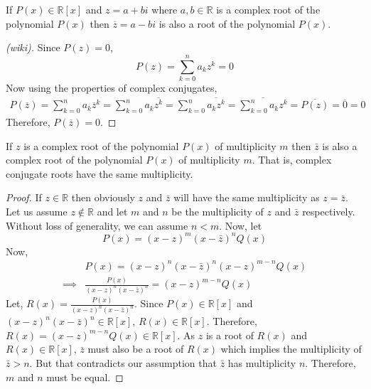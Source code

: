 \begin{theorem}
    If $P(x) \in \mathbb{R}[x]$ and $z=a+bi$ where $a,b \in \mathbb{R}$ is a complex root of the polynomial 
    $P(x)$ then $\overline{z}=a-bi$ is also a root of the polynomial $P(x)$.
\end{theorem}
\begin{proof}[(wiki)]
    Since $P(z)=0$,
    \begin{equation*}
        P(z) = \sum_{k=0}^{n} a_{k} z^{k} = 0
    \end{equation*}
    Now using the properties of complex conjugates,
    \begin{align*}
        P(\overline{z}) = \sum_{k=0}^{n} a_{k} \overline{z}^{k} 
                        = \sum_{k=0}^{n} a_{k} \overline{z^{k}} 
                        = \sum_{k=0}^{n} \overline{a_{k} z^{k}} 
                        = \overline{\sum_{k=0}^{n} a_{k} z^{k}} 
                        = \overline{P(z)} 
                        = \overline{0} 
                        = 0
    \end{align*}
    Therefore, $P(\overline{z})=0$.
\end{proof}
\begin{corollary}
    If $z$ is a complex root of the polynomial $P(x)$ of multiplicity $m$ then $\bar{z}$ is also 
    a complex root of the polynomial $P(x)$ of multiplicity $m$. That is, complex conjugate roots have 
    the same multiplicity.
\end{corollary}
\begin{proof}
    If $z \in \mathbb{R}$ then obviously $z$ and $\bar{z}$ will have the same multiplicity as $z=\bar{z}$. 
    Let us assume $z \not \in \mathbb{R}$ and let $m$ and $n$ be the multiplicity of $z$ and $\bar{z}$ respectively. 
    Without loss of generality, we can assume $n < m$. Now, let 
    \[
        P(x) = (x-z)^{m}(x-\bar{z})^{n} Q(x)
    \]
    Now,
    \begin{align*}
                 & P(x) = (x-z)^{n}(x-\bar{z})^{n} (x-z)^{m-n} Q(x) \\
        \implies & \frac{P(x)}{(x-z)^{n}(x-\bar{z})^{n}} = (x-z)^{m-n} Q(x)
    \end{align*}
    Let, $R(x) = \frac{P(x)}{(x-z)^{n}(x-\bar{z})^{n}}$. 
    Since $P(x)\in \mathbb{R}[x]$ and $(x-z)^{n}(x-\bar{z})^{n} \in \mathbb{R}[x]$, $R(x) \in \mathbb{R}[x]$. 
    Therefore, $R(x) = (x-z)^{m-n} Q(x) \in \mathbb{R}[x]$. As $z$ is a root of $R(x)$ and $R(x) \in \mathbb{R}[x]$, 
    $\bar{z}$ must also be a root of $R(x)$ which implies the multiplicity of $\bar{z} > n$. But that contradicts our 
    assumption that $\bar{z}$ has multiplicity $n$. Therefore, $m$ and $n$ must be equal.
\end{proof}

